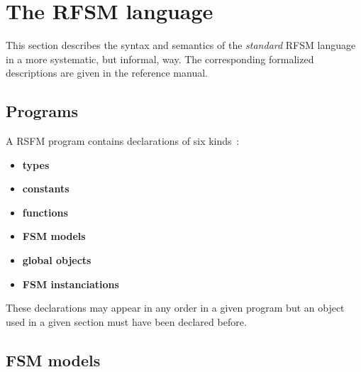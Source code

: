 \chapter{The RFSM language}
\label{cha:language}

This section describes the syntax and semantics of the \emph{standard} RFSM language in a more
systematic, but informal, way. The corresponding formalized descriptions are given in the reference
manual.

\section{Programs}
\label{sec:programs}

A RSFM program contains declarations of six kinds~: 
\begin{itemize}
\item \textbf{types}
\item \textbf{constants}
\item \textbf{functions}
\item \textbf{FSM models}
\item \textbf{global objects}
\item \textbf{FSM instanciations}
\end{itemize}

These declarations may appear in any order in a given program but an object used in a given section must
have been declared before. 

\section{FSM models}
\label{sec:fsm-models}


